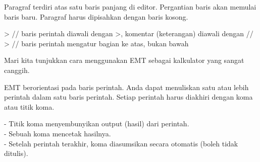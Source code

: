 \documentclass[a4paper,10pt]{article}
\begin{document}
\begin{eulernotebook}
\begin{eulercomment}
\begin{eulercomment}
\begin{eulercomment}
Paragraf terdiri atas satu baris panjang di editor. Pergantian baris
akan memulai baris baru. Paragraf harus dipisahkan dengan baris
kosong.
\end{eulercomment}
\begin{eulerprompt}
> // baris perintah diawali dengan >, komentar (keterangan) diawali dengan //
> // baris perintah mengatur bagian ke atas, bukan bawah
\end{eulerprompt}
\begin{eulercomment}
Mari kita tunjukkan cara menggunakan EMT sebagai kalkulator yang
sangat canggih.

EMT berorientasi pada baris perintah. Anda dapat menuliskan satu atau
lebih perintah dalam satu baris perintah. Setiap perintah harus
diakhiri dengan koma atau titik koma.

- Titik koma menyembunyikan output (hasil) dari perintah.\\
- Sebuah koma mencetak hasilnya.\\
- Setelah perintah terakhir, koma diasumsikan secara otomatis (boleh
tidak ditulis).


\end{eulercomment}
\end{eulercomment}
\end{eulercomment}
\end{eulernotebook}
\end{document}
